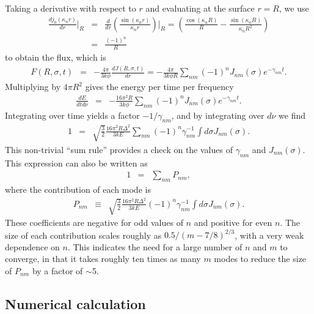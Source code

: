 \documentclass{aastex63}
\newcommand{\be}{\begin{eqnarray}}
\newcommand{\ee}{\end{eqnarray}}
\begin{document}
Taking a derivative with respect to $r$ and evaluating at the surface $r=R$, we use
\be
\frac{dj_0(\kappa_n r)}{dr} \bigg\rvert_R & =& \frac{d}{dr} \left( \frac{\sin(\kappa_n r)}{\kappa_n r} \right)\bigg\rvert_R
=  \left( \frac{\cos(\kappa_n R)}{R} - \frac{\sin(\kappa_n R)}{\kappa_n R^2} \right)
\nonumber \\ & = & \frac{(-1)^n}{R}
\ee
to obtain the flux, which is
\be
F(R,\sigma,t) & =& - \frac{4\pi}{3k\phi} \frac{dJ(R,\sigma,t)}{dr} 
= - \frac{4\pi}{3k\phi R}  \sum_{nm} (-1)^n J_{nm}(\sigma) e^{-\gamma_{nm}t}.
\ee
Multiplying by $4\pi R^2$ gives the energy per time per frequency
\be
\frac{dE}{dtd\nu} & = & - \frac{16\pi^2 R}{3k\phi}  \sum_{nm} (-1)^n J_{nm}(\sigma) e^{-\gamma_{nm}t}.
\label{eq:dEdtdnu}
\ee
Integrating over time yields a factor $-1/\gamma_{nm}$, and by integrating over $d\nu$ we find
\be \label{eq:sum_rule}
1 & = &  \sqrt{ \frac{3}{2} } \frac{16\pi^2R\Delta^2}{3kE} \sum_{nm} (-1)^n \gamma_{nm}^{-1} \int d\sigma J_{nm}(\sigma).
\ee
This non-trivial ``sum rule'' provides a check on the values of $\gamma_{nm}$ and $J_{nm}(\sigma)$. This expression can also be written as
\be
1 & =& \sum_{nm} P_{nm},
\label{eq:sumrule}
\ee
where the contribution of each mode is
\be \label{eq:pnmsoln}
P_{nm} & \equiv & \sqrt{ \frac{3}{2} } \frac{16\pi^2R\Delta^2}{3kE}  (-1)^n \gamma_{nm}^{-1} \int d\sigma J_{nm}(\sigma).
\ee
These coefficients are negative for odd values of $n$ and positive for even $n$. The size of each contribution scales roughly as $0.5/(m-7/8)^{2/3}$, with a very weak dependence on $n$. This indicates the need for a large number of $n$ and $m$ to converge, in that it takes roughly ten times as many $m$ modes to reduce the size of $P_{nm}$ by a factor of ${\sim}$5. 

\subsection{Numerical calculation}
\end{document}
